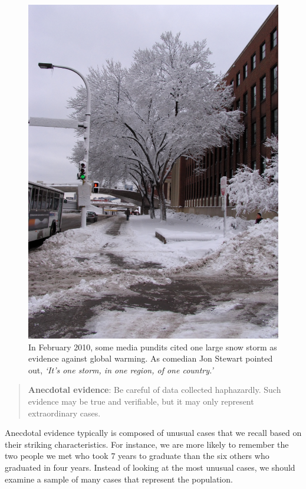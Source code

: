 \documentclass[
]{book}
\begin{document}
\begin{figure}

{\centering \includegraphics[width=11.11in]{./figures/mnWinter} 

}

\caption{In February 2010, some media pundits cited one large snow storm as evidence against global warming. As comedian Jon Stewart pointed out, \emph{`It's one storm, in one region, of one country.'}}\label{fig:unnamed-chunk-1}
\end{figure}

\begin{quote}
\textbf{Anecdotal evidence}:
Be careful of data collected haphazardly. Such evidence may be true and verifiable, but it may only represent extraordinary cases.
\end{quote}

Anecdotal evidence typically is composed of unusual cases that we recall based on their striking characteristics. For instance, we are more likely to remember the two people we met who took 7 years to graduate than the six others who graduated in four years. Instead of looking at the most unusual cases, we should examine a sample of many cases that represent the population.
\end{document}

